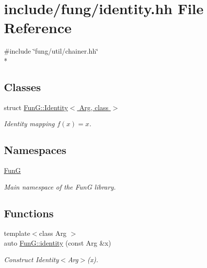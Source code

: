 \hypertarget{identity_8hh}{}\section{include/fung/identity.hh File Reference}
\label{identity_8hh}
{\ttfamily \#include \char`\"{}fung/util/chainer.\+hh\char`\"{}}\\*
\subsection*{Classes}
\begin{DoxyCompactItemize}
\item 
struct \hyperlink{structFunG_1_1Identity}{Fun\+G\+::\+Identity$<$ Arg, class $>$}
\begin{DoxyCompactList}\small\item\em Identity mapping $ f(x)=x $. \end{DoxyCompactList}\end{DoxyCompactItemize}
\subsection*{Namespaces}
\begin{DoxyCompactItemize}
\item 
 \hyperlink{namespaceFunG}{FunG}
\begin{DoxyCompactList}\small\item\em Main namespace of the FunG library. \end{DoxyCompactList}\end{DoxyCompactItemize}
\subsection*{Functions}
\begin{DoxyCompactItemize}
\item 
{\footnotesize template$<$class Arg $>$ }\\auto \hyperlink{namespaceFunG_a165e879e76d3a2a8906938f3658445ce}{Fun\+G\+::identity} (const Arg \&x)
\begin{DoxyCompactList}\small\item\em Construct Identity$<$\+Arg$>$(x). \end{DoxyCompactList}\end{DoxyCompactItemize}
